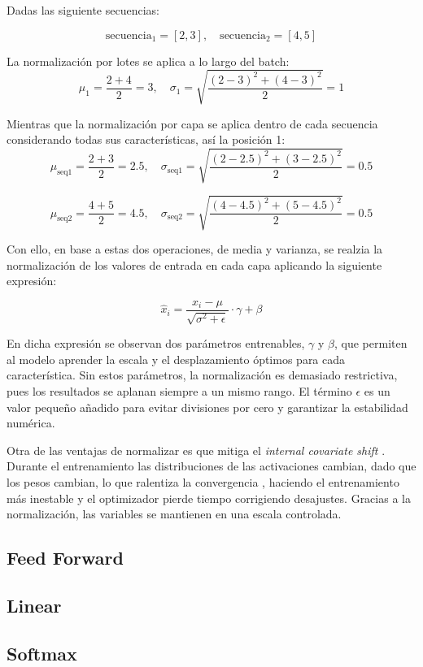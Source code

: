 \documentclass[11pt]{book}
\theoremstyle{plain}
\theoremstyle{definition}
\begin{document}
Dadas las siguiente secuencias: 

\[
\text{secuencia}_1 = [2,3], \quad \text{secuencia}_2 = [4,5]
\]

La normalización por lotes se aplica a lo largo del batch:
\[
\mu_1 = \frac{2 + 4}{2} = 3, 
\quad 
\sigma_1 = \sqrt{\frac{(2-3)^2 + (4-3)^2}{2}} = 1
\]

Mientras que la normalización por capa se aplica dentro de cada secuencia considerando todas sus características, así la posición 1:
\[
\mu_{\text{seq1}} = \frac{2 + 3}{2} = 2.5, 
\quad 
\sigma_{\text{seq1}} = \sqrt{\frac{(2-2.5)^2 + (3-2.5)^2}{2}} = 0.5
\]

\[
\mu_{\text{seq2}} = \frac{4 + 5}{2} = 4.5, 
\quad 
\sigma_{\text{seq2}} = \sqrt{\frac{(4-4.5)^2 + (5-4.5)^2}{2}} = 0.5
\]


Con ello, en base a estas dos operaciones, de media y varianza, se realzia la normalización de los valores de entrada en cada capa aplicando la siguiente expresión: 

\[
    \hat{x}_i = \frac{x_i - \mu}{\sqrt{\sigma^2 + \epsilon}} \cdot \gamma + \beta
    \label{eq:normalization_sigma}
\]

En dicha expresión se observan dos parámetros entrenables, $\gamma$ y $\beta$, que permiten al modelo aprender la escala y el desplazamiento óptimos para cada característica. Sin estos parámetros, la normalización es demasiado restrictiva, pues los resultados se aplanan siempre a un mismo rango. El término $\epsilon$ es un valor pequeño añadido para evitar divisiones por cero y garantizar la estabilidad numérica.

Otra de las ventajas de normalizar es que mitiga el \textit{internal covariate shift} \parencite{sharma2024addnorm}. Durante el entrenamiento las distribuciones de las activaciones cambian, dado que los pesos cambian, lo que ralentiza la convergencia \parencite{apxml_addnorm}, haciendo el entrenamiento más inestable y el optimizador pierde tiempo corrigiendo desajustes. Gracias a la normalización, las variables se mantienen en una escala controlada.


\subsection{Feed Forward}
\subsection{Linear}
\subsection{Softmax}
\end{document}
